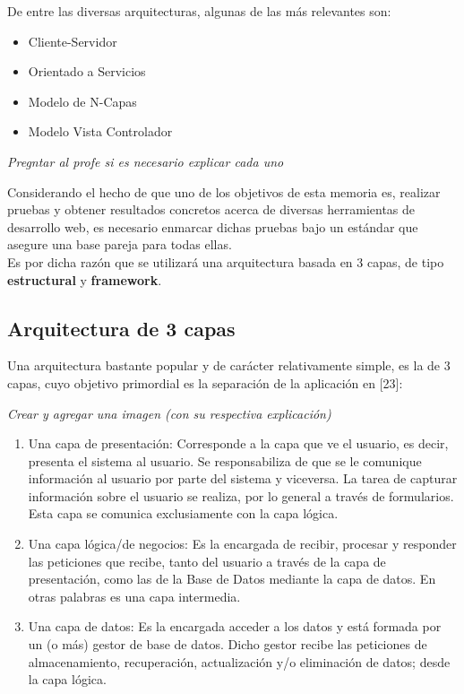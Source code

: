 De entre las diversas arquitecturas, algunas de las más relevantes son:
\begin{itemize}
 \item Cliente-Servidor
 \item Orientado a Servicios
 \item Modelo de N-Capas
 \item Modelo Vista Controlador
\end{itemize}
\textit{Pregntar al profe si es necesario explicar cada uno}

Considerando el hecho de que uno de los objetivos de esta memoria es, realizar pruebas y obtener
resultados concretos acerca de diversas herramientas de desarrollo web, es necesario enmarcar
dichas pruebas bajo un estándar que asegure una base pareja para todas ellas.\\

Es por dicha razón que se utilizará una arquitectura basada en 3 capas, de tipo \textbf{estructural} y 
\textbf{framework}.\\

\subsection{Arquitectura de 3 capas}
Una arquitectura bastante popular y de carácter relativamente simple, es la de 3 capas, cuyo
objetivo primordial es la separación de la aplicación en [23]:

\textit{Crear y agregar una imagen (con su respectiva explicación)}\\

\begin{enumerate}
 \item Una capa de presentación: Corresponde a la capa que ve el usuario, es decir, presenta 
  el sistema al usuario. Se responsabiliza de que se le comunique información al usuario por 
  parte del sistema y viceversa. La tarea de capturar información sobre el usuario se realiza,
  por lo general a través de formularios. Esta capa se comunica exclusiamente con la capa lógica.
  
 \item Una capa lógica/de negocios: Es la encargada de recibir, procesar y responder las peticiones
  que recibe, tanto del usuario a través de la capa de presentación, como las de la Base de Datos mediante
  la capa de datos. En otras palabras es una capa intermedia.
 
 \item Una capa de datos: Es la encargada acceder a los datos y está formada por un (o más) gestor de 
  base de datos. Dicho gestor recibe las peticiones de almacenamiento, recuperación, actualización y/o 
  eliminación de datos; desde la capa lógica. 
\end{enumerate}

